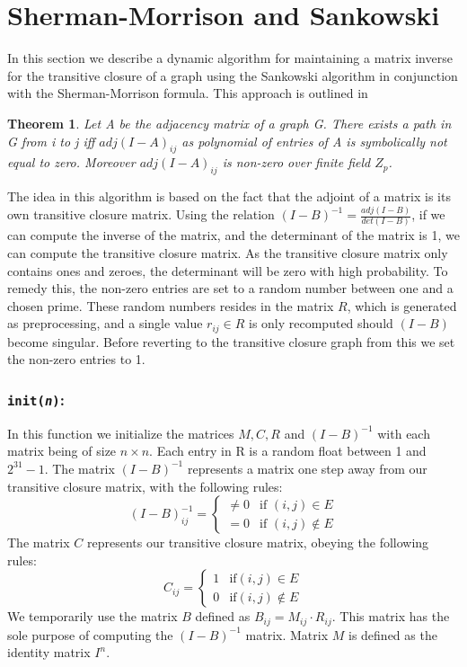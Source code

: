 \documentclass[a4paper,oneside,article]{memoir}
\begin{document}
\section{Sherman-Morrison and Sankowski}
In this section we describe a dynamic algorithm for maintaining a
matrix inverse for the transitive closure of a graph using the
Sankowski algorithm in conjunction with the Sherman-Morrison formula.
This approach is outlined in \cite{sankowski}
\newtheorem{Sankowski}{Theorem}
\begin{Sankowski}
Let A be the adjacency matrix of a graph G. There exists a path in G
from i to j iff $adj(I - A)_{ij}$ as polynomial of entries of A is
symbolically not equal to zero. Moreover $adj(I - A)_{ij}$ is non-zero
over finite field $Z_p$.
\end{Sankowski}
The idea in this algorithm is based on the fact that the adjoint of a
matrix is its own transitive closure matrix. Using the relation $(I -
B)^{-1}=\frac{adj(I - B)}{det(I - B)}$, if we can compute the inverse
of the matrix, and the determinant of the matrix is 1, we can compute
the transitive closure matrix. As the transitive closure matrix only
contains ones and zeroes, the determinant will be zero with high
probability. To remedy this, the non-zero entries are set to a random
number between one and a chosen prime. These random numbers resides in
the matrix $R$, which is generated as preprocessing, and a single
value $r_{ij} \in R$ is only recomputed should $(I - B)$ become
singular. Before reverting to the transitive closure graph from this
we set the non-zero entries to 1.
\subsubsection{\texttt{init(\textit{n})}:}
In this function we initialize the matrices $M, C, R$
and $(I-B)^{-1}$ with each matrix being of size $n\times n$. Each
entry in R is a random float between 1 and $2^{31}-1$. The matrix $(I - B)^{-1}$
represents a matrix one step away from our transitive closure matrix,
with the following rules:
$$(I - B)^{-1}_{ij} =
\begin{cases}
  \neq 0 & \text{if } (i,j) \in E \\
 = 0 & \text{if } (i,j) \notin E 
\end{cases}
$$
The matrix $C$ represents our transitive closure matrix, obeying the following rules:
$$C_{ij} =
\begin{cases}
  1 & \text{if} (i,j) \in E \\
  0 & \text{if} (i,j) \notin E 
\end{cases}
$$ We temporarily use the matrix $B$ defined as $B_{ij} = M_{ij} \cdot
R_{ij}$. This matrix has the sole purpose of computing the $(I -
B)^{-1}$ matrix. Matrix $M$ is defined as the identity matrix $I^n$.
\end{document}
